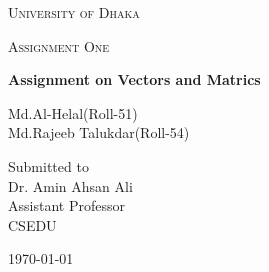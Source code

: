 \documentclass[12pt,a4paper]{report}
\begin{document}
\begin{titlepage}
\centering
{\scshape\LARGE University of Dhaka \par}
\vspace{1cm}
{\scshape\Large Assignment One\par}
\vspace{1.5cm}
{\huge\bfseries Assignment on Vectors and Matrics\par}
\vspace{2cm}
{\Large Md.Al-Helal(Roll-51)\\Md.Rajeeb Talukdar(Roll-54)\par}
\vfill
Submitted to\\
\vspace{0.5cm}
Dr. Amin Ahsan Ali \\ Assistant Professor\\CSEDU
\vfill
{\large \today\par}
\end{titlepage}
\end{document}
